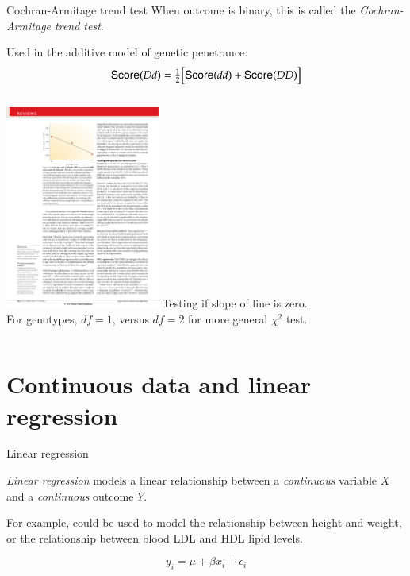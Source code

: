 \documentclass[serif,mathserif,professionalfonts]{beamer}
\begin{document}
\begin{frame}{Cochran-Armitage trend test}
  When outcome is binary, this is called the \emph{Cochran-Armitage
    trend test}.

  Used in the additive model of genetic penetrance: 
  $$ {\sf Score}(Dd) = \tfrac{1}{2} \big[{\sf Score}(dd)+ {\sf
    Score}(DD)\big]$$

  \begin{columns}[c]
    \column{2in}
    \includegraphics[width=2in]{balding-armitage.pdf}
   \column{2in}
    Testing if slope of line is zero.\\ \bigskip
    For genotypes, $df=1$, versus $df=2$ for more general $\chi^2$ test.
  \end{columns}
  \color{gray}{\small Figure credit: Balding reference}
\end{frame}

\section{Continuous data and linear regression}

\begin{frame}{Linear regression}

  \emph{Linear regression} models a linear relationship between a
  \emph{continuous} variable $X$ and a \emph{continuous} outcome $Y$.

  For example, could be used to model the relationship between height
  and weight, or the relationship between blood LDL and HDL lipid
  levels.

  $$y_i = \mu + \beta x_i + \epsilon_i$$
 
\end{frame}
\end{document}
